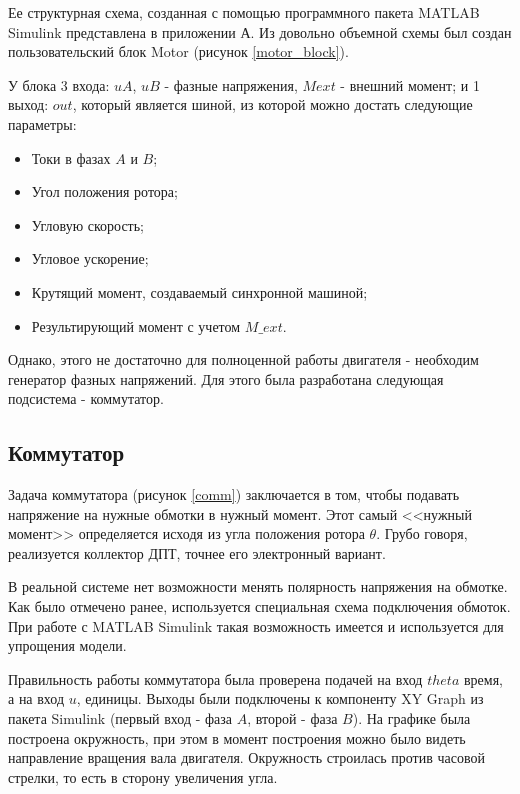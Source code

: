 Ее структурная схема, созданная с помощью программного пакета
MATLAB Simulink представлена в приложении А. %
Из довольно объемной схемы был создан пользовательский блок Motor (рисунок \ref{motor_block}).

У блока 3 входа: $uA$, $uB$ - фазные напряжения, $Mext$ - внешний момент; 
и 1 выход: $out$, который является шиной, из которой можно достать следующие параметры:

\begin{itemize}
  \item Токи в фазах $A$ и $B$;
  \item Угол положения ротора;
  \item Угловую скорость;
  \item Угловое ускорение;
  \item Крутящий момент, создаваемый синхронной машиной;
  \item Результирующий момент с учетом $M\_ext$.
\end{itemize}


Однако, этого не достаточно для полноценной работы двигателя - необходим генератор фазных напряжений.
Для этого была разработана следующая подсистема - коммутатор.

\subsection{Коммутатор}

Задача коммутатора (рисунок \ref{comm}) заключается в том, чтобы подавать напряжение на нужные обмотки в нужный момент.
Этот самый <<нужный момент>> определяется исходя из угла положения ротора $\theta$. Грубо говоря,
реализуется коллектор ДПТ, точнее его электронный вариант.

В реальной системе нет возможности менять полярность напряжения на обмотке. Как было отмечено ранее,
используется специальная схема подключения обмоток. При работе с MATLAB Simulink такая возможность имеется и
используется для упрощения модели. 

Правильность работы коммутатора была проверена подачей на вход $theta$ 
время, а на вход $u$, единицы. Выходы были подключены к компоненту XY Graph 
из пакета Simulink (первый вход - фаза $A$, второй - фаза $B$). На графике была 
построена окружность, при этом в момент построения можно было видеть направление вращения 
вала двигателя. Окружность строилась против часовой стрелки, то есть в сторону увеличения угла. 

